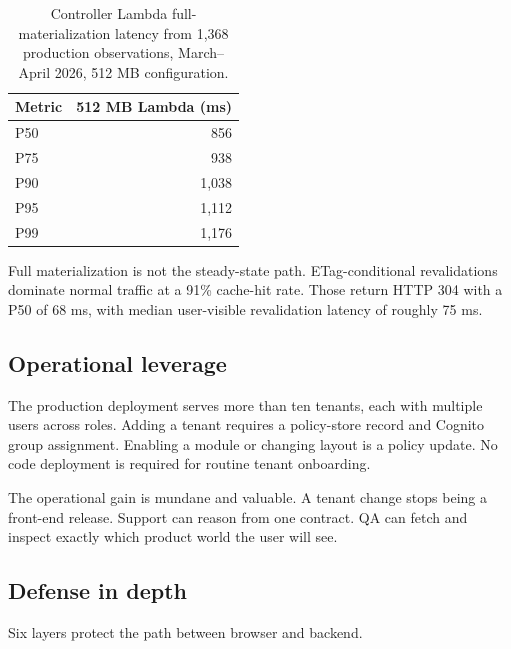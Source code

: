 \begin{table}[H]
  \centering
  \small
  \begin{tabularx}{0.55\textwidth}{X r}
    \toprule
    \textbf{Metric} & \textbf{512 MB Lambda (ms)} \\
    \midrule
    P50 & 856 \\
    P75 & 938 \\
    P90 & 1,038 \\
    P95 & 1,112 \\
    P99 & 1,176 \\
    \bottomrule
  \end{tabularx}
  \caption{Controller Lambda full-materialization latency from 1,368 production observations, March--April 2026, 512 MB configuration.}
  \label{tab:runtime}
\end{table}

Full materialization is not the steady-state path. ETag-conditional revalidations dominate normal traffic at a 91\% cache-hit rate. Those return HTTP 304 with a P50 of 68 ms, with median user-visible revalidation latency of roughly 75 ms.

\subsection{Operational leverage}
\label{sec:operational_leverage}

The production deployment serves more than ten tenants, each with multiple users across roles. Adding a tenant requires a policy-store record and Cognito group assignment. Enabling a module or changing layout is a policy update. No code deployment is required for routine tenant onboarding.

The operational gain is mundane and valuable. A tenant change stops being a front-end release. Support can reason from one contract. QA can fetch  and inspect exactly which product world the user will see.

\subsection{Defense in depth}
\label{sec:defense_in_depth}

Six layers protect the path between browser and backend.

